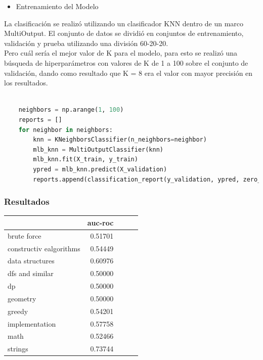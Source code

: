\documentclass{article}
\begin{document}
\begin{itemize}
    \item Entrenamiento del Modelo
\end{itemize}
La clasificación se realizó utilizando un clasificador KNN dentro de un marco MultiOutput. El conjunto de datos se dividió en conjuntos de entrenamiento, validación y prueba utilizando una división 60-20-20.\\ 
Pero cuál sería el mejor valor de K para el modelo, para esto se realizó una búsqueda de hiperparámetros con valores de K de 1 a 100 sobre el conjunto de validación, dando como resultado que K = 8 era el valor con mayor precisión en los resultados.

\begin{lstlisting}[language=Python, caption=KNN]
        
    neighbors = np.arange(1, 100)
    reports = []
    for neighbor in neighbors:
        knn = KNeighborsClassifier(n_neighbors=neighbor)
        mlb_knn = MultiOutputClassifier(knn)
        mlb_knn.fit(X_train, y_train)
        ypred = mlb_knn.predict(X_validation) 
        reports.append(classification_report(y_validation, ypred, zero_division = 0))
    \end{lstlisting}

\subsubsection{Resultados}

\begin{tabular}{lrrrr}
    \toprule
    {}                      & auc-roc \\
    \midrule
    brute force             & 0.51701 \\
    constructiv ealgorithms & 0.54449 \\
    data structures         & 0.60976 \\
    dfs and similar         & 0.50000 \\
    dp                      & 0.50000 \\
    geometry                & 0.50000 \\
    greedy                  & 0.54201 \\
    implementation          & 0.57758 \\
    math                    & 0.52466 \\
    strings                 & 0.73744 \\
    \bottomrule
\end{tabular}
\end{document}
